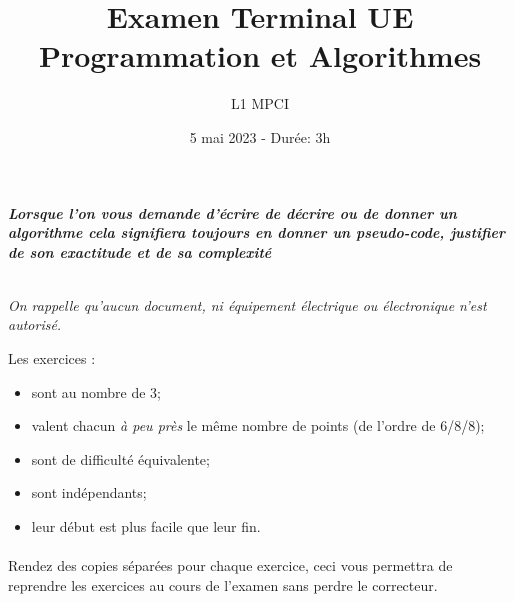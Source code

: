 \documentclass{article}
\title{Examen Terminal UE Programmation et Algorithmes}
\author{L1 MPCI}
\date{5 mai 2023 - Durée: 3h}
\theoremstyle{exostyle}
\theoremstyle{partiestyle}
\theoremstyle{questionstyle}
\begin{document}
\maketitle

\begin{center}
{\em\bf Lorsque l'on vous demande d'écrire de décrire ou de donner un algorithme cela signifiera toujours en donner un pseudo-code, justifier de son exactitude et de sa complexité}

~\\

{\em On rappelle qu'aucun document, ni équipement électrique ou électronique n'est autorisé. }
\end{center}

\vspace*{1cm}
Les exercices :
\begin{itemize}
\item sont au nombre de 3;
\item valent chacun {\em à peu près} le même nombre de points (de l'ordre de 6/8/8);
\item sont de difficulté équivalente;
\item sont indépendants;
\item leur début est plus facile que leur fin.
\end{itemize}

\paragraph{}Rendez des copies séparées pour chaque exercice, ceci vous permettra de reprendre les exercices au cours de l'examen sans perdre le correcteur.
\vspace*{1cm}

\clearpage
\end{document}
